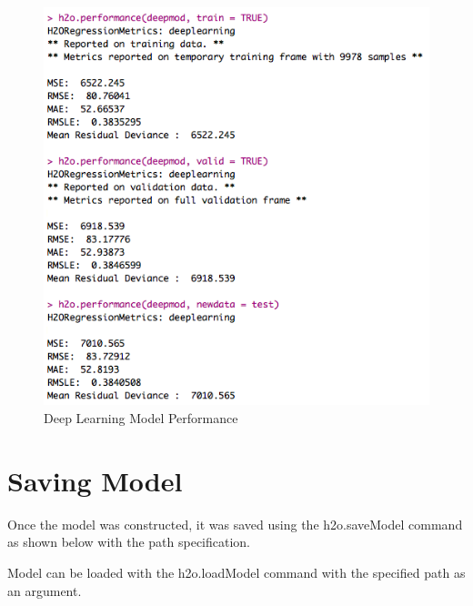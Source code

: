 \documentclass[12pt,twoside]{amherstthesis}
\begin{document}
  \begin{figure}[htbp]
  \centering
  \includegraphics[scale = 0.7,angle = 0]{figure/deepModml.png}
  \caption[Deep Learning Model Performance]{\normalsize{Deep Learning Model Performance}}
  \label{fig:Hyarn9}
  \end{figure}
  
  \clearpage 
  
  \section{Saving Model}\label{saving-model}
  
  Once the model was constructed, it was saved using the h2o.saveModel
  command as shown below with the path specification.
  
  \begin{Shaded}
  \begin{Highlighting}[]
  \StringTok{ } \NormalTok{, } \NormalTok{) }
  \end{Highlighting}
  \end{Shaded}
  
  Model can be loaded with the h2o.loadModel command with the specified
  path as an argument.
  
\end{document}
